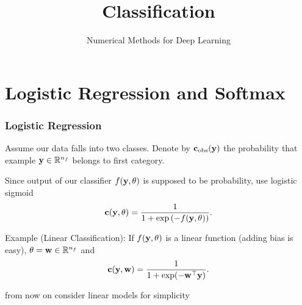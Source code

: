 \documentclass[12pt,fleqn,handout]{beamer}
\title{Classification}
\subtitle{Numerical Methods for Deep Learning}
\date{}
\begin{document}
\makebeamertitle

\section{Logistic Regression and Softmax} %
\label{sec:logistic_regression_and_softmax}

\begin{frame}
	\frametitle{Logistic Regression}
	
	
	Assume our data falls into two classes. Denote by ${\bf c}_{\rm obs}({\bf y})$ the probability that example ${\bf y}\in\mathbb{R}^{n_f}$ belongs to first category.
	
	\bigskip
	
	Since output of our classifier $f({\bf y},\theta)$ is supposed to be probability, use logistic sigmoid
	$$
		{\bf c}({\bf y},\theta) = \frac{1}{1 + \exp\left(-f({\bf y},\theta)\right)}.
	$$
	
	\bigskip
	
	Example (Linear Classification): If $f({\bf y},\theta)$ is a linear function (adding bias is easy), $\theta = {\bf w} \in \mathbb{R}^{n_f}$ and
	$$
		{\bf c}({\bf y},{\bf w}) = \frac{1}{1 + \exp(-{\bf w}^\top{\bf y})}.
	$$
	
	\begin{center}
		from now on consider linear models for simplicity
	\end{center}
	
\end{frame}
\end{document}
